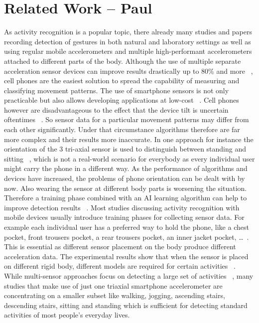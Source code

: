 \documentclass[conference]{IEEEtran}
\begin{document}
\section{Related Work -- Paul}
As activity recognition is a popular topic, there already many studies and papers recording detection of gestures in both natural and laboratory settings as well as using regular mobile accelerometers and multiple high-performant accelerometers attached to different parts of the body.
Although the use of multiple separate acceleration sensor devices can improve results drastically up to 80\% and more ~\cite{Bao2004}, cell phones are the easiest solution to spread the capability of measuring and classifying movement patterns. 
The use of smartphone sensors is not only practicable but also allows developing applications at low-cost ~\cite{Brezmes2009}.
Cell phones however are disadvantageous to the effect that the device tilt is uncertain oftentimes ~\cite{Brezmes2009}. So sensor data for a particular movement patterns may differ from each other significantly. Under that circumstance algorithms therefore are far more complex and their results more inaccurate. In one approach for instance the orientation of the 3 tri-axial sensor is used to distinguish between standing and sitting ~\cite{Kwapisz2011}, which is not a real-world scenario for everybody as every individual user might carry the phone in a different way. As the performance of algorithms and devices have increased, the problems of phone orientation can be dealt with by now. Also wearing the sensor at different body parts is worsening the situation. Therefore a training phase combined with an AI learning algorithm can help to improve detection results ~\cite{Kwapisz2011,Bao2004}. Most studies discussing activity recognition with mobile devices usually introduce training phases for collecting sensor data. For example each individual user has a preferred way to hold the phone, like a chest pocket, front trousers pocket, a rear trousers pocket, an inner jacket pocket, \dots ~\cite{Brezmes2009}. This is essential as different sensor placement on the body produce different acceleration data. The experimental results show that when the sensor is placed on different rigid body, different models are required for certain activities ~\cite{Henpraserttae2011}.
While multi-sensor approaches focus on detecting a large set of activities ~\cite{Bao2004}, many studies that make use of just one triaxial smartphone accelerometer are concentrating on a smaller subset like walking, jogging, ascending stairs, descending stairs, sitting and standing which is sufficient for detecting standard activities of most people's everyday lives.
\end{document}
